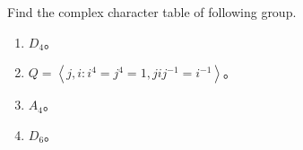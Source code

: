 \documentclass{ctexart}
\newif\ifpreface
\begin{document}
\large
\setlength{\baselineskip}{1.2em}
\ifpreface

\newgeometry{left=2cm,right=2cm,top=2cm,bottom=2cm}
\else
{}
\maketitle
\fi
\begin{problem}
  Find the complex character table of following group.
  \begin{enumerate}
    \item \(D_4\)\nolinebreak[4]。
    \item \(Q=\left\langle j,i:i^4=j^4=1,jij^{-1}=i^{-1}\right\rangle \)\nolinebreak[4]。
    \item \(A_4\)\nolinebreak[4]。
    \item \(D_6\)\nolinebreak[4]。
  \end{enumerate}
\end{problem}
\end{document}
